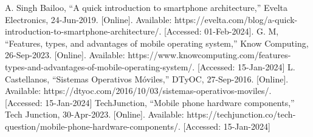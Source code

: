 \documentclass[conference]{IEEEtran}
\begin{document}
\begin{thebibliography}{00}
 A. Singh Bailoo, “A quick introduction to smartphone architecture,” Evelta Electronics, 24-Jun-2019.  [Online]. Available: https://evelta.com/blog/a-quick-introduction-to-smartphone-architecture/. [Accessed: 01-Feb-2024].
 G. M, “Features, types, and advantages of mobile operating system,” Know Computing, 26-Sep-2023.  [Online]. Available: https://www.knowcomputing.com/features-types-and-advantages-of-mobile-operating-system/. [Accessed: 15-Jan-2024]  
 L. Castellanos, “Sistemas Operativos Móviles,” DTyOC, 27-Sep-2016.  [Online]. Available: https://dtyoc.com/2016/10/03/sistemas-operativos-moviles/. [Accessed: 15-Jan-2024]  
 TechJunction, “Mobile phone hardware components,” Tech Junction, 30-Apr-2023.  [Online]. Available: https://techjunction.co/tech-question/mobile-phone-hardware-components/. [Accessed: 15-Jan-2024] 
\end{thebibliography}
\end{document}
